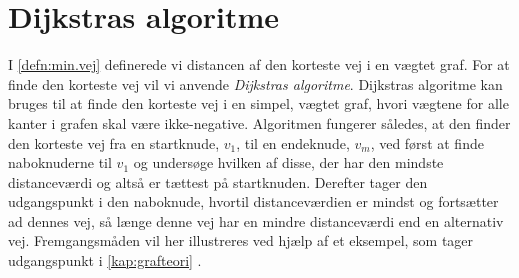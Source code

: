 \section{Dijkstras algoritme}
I \ref{defn:min.vej} definerede vi distancen af den korteste vej i en vægtet graf. For at finde den korteste vej vil vi anvende \emph{Dijkstras algoritme}. Dijkstras algoritme kan bruges til at finde den korteste vej i en simpel, vægtet graf, hvori vægtene for alle kanter i grafen skal være ikke-negative. Algoritmen fungerer således, at den finder den korteste vej fra en startknude, $v_{1}$, til en endeknude, $v_{m}$, ved først at finde naboknuderne til $v_{1}$ og undersøge hvilken af disse, der har den mindste distanceværdi og altså er tættest på startknuden. Derefter tager den udgangspunkt i den naboknude, hvortil distanceværdien er mindst og fortsætter ad dennes vej, så længe denne vej har en mindre distanceværdi end en alternativ vej. Fremgangsmåden vil her illustreres ved hjælp af et eksempel, som tager udgangspunkt i \ref{kap:grafteori} .

